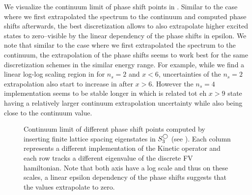 We visualize the continuum limit of phase shift points in .
Similar to the case where we first extrapolated the spectrum to the continuum and computed phase shifts afterwards, the best discretization allows to also extrapolate higher excited states to zero--visible by the linear dependency of the phase shifts in epsilon.
We note that similar to the case where we first extrapolated the spectrum to the continuum, the extrapolation of the phase shifts seems to work best for the same discretization schemes in the similar energy range.
For example, while we find a linear log-log scaling region in  for $n_s = 2$ and $x<6$, uncertainties of the $n_s =2$ extrapolation also start to increase in  after $x>6$.
However the $n_s = 4$ implementation seems to be stable longer in  which is related tot eh $x>9$ state having a relatively larger continuum extrapolation uncertainty while also being close to the continuum value.


\begin{figure}[th]
    \scalebox{1.0}{}
    \caption{
        \label{fig:iv-continuum}
        Continuum limit of different phase shift points computed by inserting finite lattice spacing eigenstates in $S^{\bigcirc}_3$ (see ).
        Each column represents a different implementation of the Kinetic operator and each row tracks a different eigenvalue of the discrete FV hamiltonian.
        Note that both axis have a log scale and thus on these scales, a linear epsilon dependency of the phase shifts suggests that the values extrapolate to zero.
    }
\end{figure}
